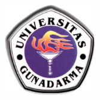
\begin{titlepage}

\begin{adjustwidth}{-1cm}{-1.5cm}
\begin{center}

\Large

\hfill

\begingroup
\color{CeruleanDark}\spacedallcaps{\myTitleLineOne} \\%
\spacedallcaps{\myTitleLineTwo} \\
\bigskip
\endgroup

\spacedlowsmallcaps{\myName}

\vfill

\includegraphics[width=4cm]{include/logo} \\ \medskip

\vfill

\mySubtitle \\ \medskip %


\vfill

\end{center}
\end{adjustwidth}

\end{titlepage}
